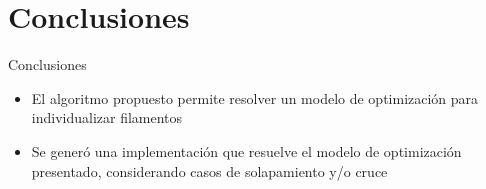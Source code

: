 \documentclass[]{beamer}
\begin{document}
\section{Conclusiones}
\begin{frame}{Conclusiones}
\begin{itemize}
    \item El algoritmo propuesto permite resolver un modelo de optimizaci\'on para individualizar filamentos

    \item Se gener\'o una implementaci\'on que resuelve el modelo de optimizaci\'on presentado, considerando casos de solapamiento y/o cruce
    
    
\end{itemize}
\end{frame}

\end{document}
